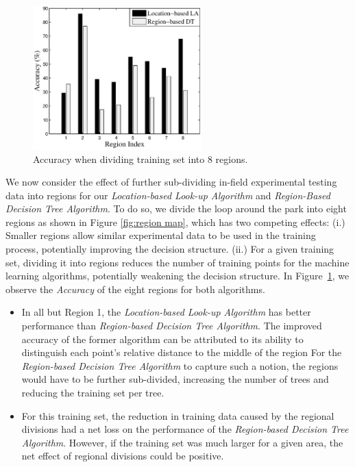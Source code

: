 \begin{figure}
\vspace{-0.1in}
\centering
\includegraphics[width=65mm]{figures/mvsl}
\vspace{-0.1in}
\caption{Accuracy when dividing training set into 8 regions.}
\label{fig:mvsl}
\vspace{0.1in}
\end{figure}

We now consider the effect of further sub-dividing in-field experimental testing data into regions for our \emph{Location-based Look-up Algorithm} 
and \emph{Region-Based Decision Tree Algorithm}. To do so, we divide the    
loop around the park into eight regions as shown in Figure \ref{fig:region map},
which has two competing effects: (i.) Smaller regions allow similar experimental
data to be used in the training process, potentially improving the decision
structure. (ii.) For a given training set, dividing it into regions reduces
the number of training points for the machine learning algorithms, potentially
weakening the decision structure.  In Figure~\ref{fig:mvsl}, we observe 
the \emph{Accuracy} of the eight regions for both algorithms.
\begin{itemize}
\item
In all but Region 1, the \emph{Location-based Look-up Algorithm} has better 
performance than \emph{Region-based Decision Tree Algorithm}. The improved
accuracy of the former algorithm can be attributed to its ability to
distinguish each point's relative distance to the middle of the region
For the \emph{Region-based Decision Tree Algorithm}
to capture such a notion, the regions would have to be further sub-divided,
increasing the number of trees and reducing the training set per tree.
\item
For this training set, the reduction in training data caused by the
regional divisions had a net loss on the performance of the \emph{Region-based Decision Tree Algorithm}. However, if the training set was much larger
for a given area, the net effect of regional divisions could be positive.
\end{itemize}




